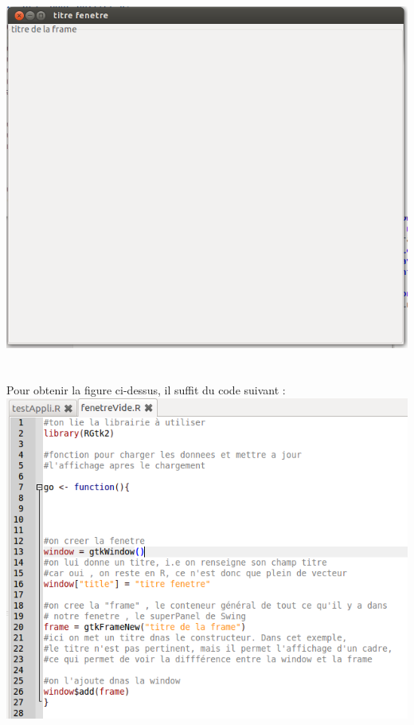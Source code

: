 \documentclass{article}
\begin{document}
\includegraphics[scale=0.5]{fenetreVide.png}\\\\

\paragraph{} 
Pour obtenir la figure ci-dessus, il suffit du code suivant :\\

\includegraphics[scale=0.5]{exempleCode.png}
\end{document}
